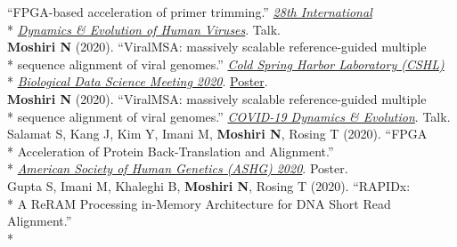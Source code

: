 \documentclass[margin,line]{res}
\begin{document}
\begin{resume}
\hspace*{9.5mm} ``FPGA-based acceleration of primer trimming.'' \href{https://cpd.ucsd.edu/hivdynamics/}{\textit{28th International}}\\*\vspace{2mm}
\hspace*{8mm} \href{https://cpd.ucsd.edu/hivdynamics/}{\textit{Dynamics \& Evolution of Human Viruses}}. Talk.\\
\hspace*{4mm} \textbf{Moshiri N} (2020). ``ViralMSA: massively scalable reference-guided multiple\\*
\hspace*{9.5mm} sequence alignment of viral genomes.'' \href{http://meetings.cshl.edu/meetings.aspx?meet=DATA&year=20}{\textit{Cold Spring Harbor Laboratory (CSHL)}}\\*\vspace{2mm}
\hspace*{8mm} \href{http://meetings.cshl.edu/meetings.aspx?meet=DATA&year=18}{\textit{Biological Data Science Meeting 2020}}. \href{https://meetings.cshl.edu/posters/data20/data2020_AbstractBookVirtual.pdf}{Poster}.\\
\hspace*{4mm} \textbf{Moshiri N} (2020). ``ViralMSA: massively scalable reference-guided multiple\\*\vspace{2mm}
\hspace*{8mm} sequence alignment of viral genomes.'' \href{https://cpd.ucsd.edu/covid19/}{\textit{COVID-19 Dynamics \& Evolution}}. Talk.\\
\hspace*{4mm} Salamat S, Kang J, Kim Y, Imani M, \textbf{Moshiri N}, Rosing T (2020). ``FPGA\\*
\hspace*{9.5mm} Acceleration of Protein Back-Translation and Alignment.''\\*\vspace{2mm}
\hspace*{7mm} \href{https://www.ashg.org/meetings/2020meeting}{\textit{American Society of Human Genetics (ASHG) 2020}}. Poster.\\
\hspace*{4mm} Gupta S, Imani M, Khaleghi B, \textbf{Moshiri N}, Rosing T (2020). ``RAPIDx:\\*
\hspace*{9.5mm} A ReRAM Processing in-Memory Architecture for DNA Short Read Alignment.''\\*\vspace{2mm}

\end{resume}
\end{document}
